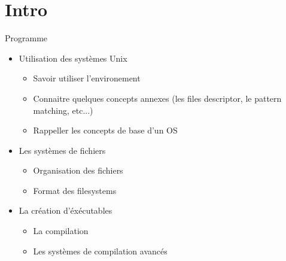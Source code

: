 %
%
%

\part{Intro}

\begin{frame}[fragile=singleslide]{Programme}
  \begin{itemize} 
  \item Utilisation des systèmes Unix
    \begin{itemize}
    \item Savoir utiliser l'environement
    \item Connaitre  quelques concepts annexes  (les files descriptor,
      le pattern matching, etc...)
    \item Rappeller les concepts de base d'un OS
    \end{itemize}
  \item Les systèmes de fichiers
    \begin{itemize}
      \item Organisation des fichiers
      \item Format des filesystems
    \end{itemize}
  \item La création d'éxécutables
    \begin{itemize} 
    \item La compilation
    \item Les systèmes de compilation avancés
    \end{itemize} 
  \end{itemize}
\end{frame}
